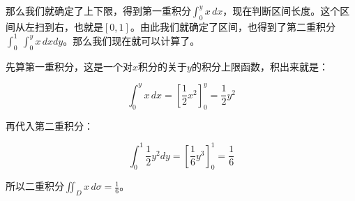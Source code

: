 \begin{myexample}
\begin{center}
\end{center}
   
那么我们就确定了上下限，得到第一重积分$\int_{0}^y x \, dx$，现在判断区间长度。这个区间从左扫到右，也就是$[0,1]$。由此我们就确定了区间，也得到了第二重积分$\int_0^1\ \int_{0}^y x \, dxdy$。那么我们现在就可以计算了。

先算第一重积分，这是一个对$x$积分的关于$y$的积分上限函数，积出来就是：

$$\int_{0}^y x \, dx=\left[\frac{1}{2}x^2\right]_0^y=\frac{1}{2}y^2$$

再代入第二重积分：

$$\int_0^1 \frac{1}{2}y^2 dy =\left[ \frac{1}{6}y^3\right]_0^1=\frac{1}{6}$$


所以二重积分$\iint_D x \, d\sigma=\frac{1}{6}$。
\end{myexample}


